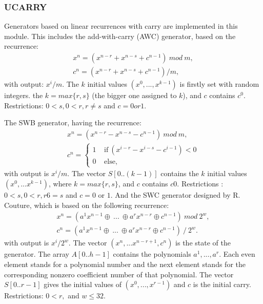 \subsubsection{UCARRY}
Generators based on linear recurrences with carry are implemented in this module. This includes the add-with-carry (AWC) generator, based on the recurrence:
\begin{equation}
\label{AWC}
\begin{array}{l}
x^n = (x^{n-r} + x^{n-s} + c^{n-1})~mod~m, \\
c^n= (x^{n-r} + x^{n-s} + c^{n-1}) / m, \end{array}\end{equation}
with output: $x^i/m$. The $k$ initial values $(x^0,... ,x^{k-1})$ is firstly set with random integers.
the $k = max\{r, s\}$ (the bigger one assigned to $k$), and $c$ contains $c^0$. Restrictions: $0 < s, 0 < r, r\neq s$ and $c = 0 or 1$.

The SWB generator, having the recurrence:
\begin{equation}
\label{SWB}
\begin{array}{l}
x^n = (x^{n-r} - x^{n-s} - c^{n-1})~mod~m, \\
c^n=\left\{
\begin{array}{l}
1 ~~~~~\text{if}~ (x^{i-r} - x^{i-s} - c^{i-1})<0\\
0 ~~~~~\text{else},\end{array} \right. \end{array}\end{equation}
with output is $x^i/m$. The vector $S[0..(k-1)]$ contains
the $k$ initial values $(x^0,... x^{k-1})$, where $k = max\{r, s\}$, and $c$ contains $c0$. Restrictions : $0 < s,0 < r, r 6= s$ and $c = 0$ or $1$.
And the SWC generator designed by R. Couture, which is based on the following recurrence:
\begin{equation}
\label{SWC}
\begin{array}{l}
x^n = (a^1x^{n-1} \oplus ~...~ \oplus a^rx^{n-r} \oplus c^{n-1}) ~ mod ~ 2^w, \\
c^n = (a^1x^{n-1} \oplus ~...~ \oplus a^rx^{n-r} \oplus c^{n-1}) ~ / ~ 2^w. \end{array}\end{equation}
with output is $x^i/2^w$. The vector $(x^n,...x^{n-r+1}, c^n)$ is the state of the generator. The array $A[0..h-1]$ contains the polynomials $a^1,...,a^r$. Each even element stands for a polynomial number and the next
element stands for the corresponding nonzero coefficient number of that polynomial. The vector
$S[0..r-1]$ gives the initial values of $(x^0,...,x^{r-1})$ and $c$ is the initial carry. Restrictions: $0 < r,$
and $w \leq 32$.

